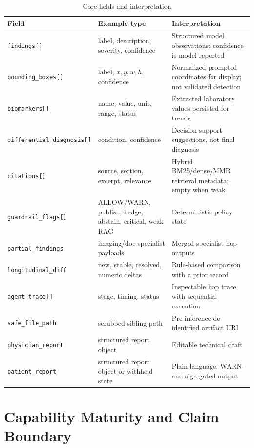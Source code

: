 \documentclass[conference]{IEEEtran}
\begin{document}
\begin{table}[t]
\caption{Core fields and interpretation}
\label{tab:schema}
\centering
\scriptsize
\begin{tabular}{p{}p{}p{}}
\toprule
Field & Example type & Interpretation \\
\midrule
\texttt{findings[]} & label, description, severity, confidence & Structured model observations; confidence is model-reported \\
\texttt{bounding\_boxes[]} & label, \(x,y,w,h\), confidence & Normalized prompted coordinates for display; not validated detection \\
\texttt{biomarkers[]} & name, value, unit, range, status & Extracted laboratory values persisted for trends \\
\texttt{differential\_diagnosis[]} & condition, confidence & Decision-support suggestions, not final diagnosis \\
\texttt{citations[]} & source, section, excerpt, relevance & Hybrid BM25/dense/MMR retrieval metadata; empty when weak \\
\texttt{guardrail\_flags[]} & ALLOW/WARN, publish, hedge, abstain, critical, weak RAG & Deterministic policy state \\
\texttt{partial\_findings} & imaging/doc specialist payloads & Merged specialist hop outputs \\
\texttt{longitudinal\_diff} & new, stable, resolved, numeric deltas & Rule-based comparison with a prior record \\
\texttt{agent\_trace[]} & stage, timing, status & Inspectable hop trace with sequential execution \\
\texttt{safe\_file\_path} & scrubbed sibling path & Pre-inference de-identified artifact URI \\
\texttt{physician\_report} & structured report object & Editable technical draft \\
\texttt{patient\_report} & structured report object or withheld state & Plain-language, WARN- and sign-gated output \\
\bottomrule
\end{tabular}
\end{table}

\section{Capability Maturity and Claim Boundary}
\end{document}
